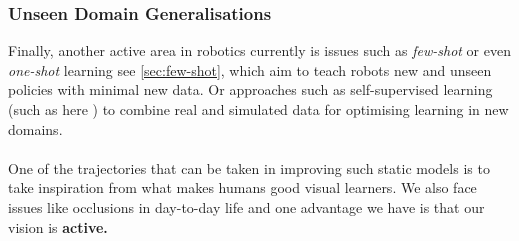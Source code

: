     \subsubsection{Unseen Domain Generalisations}
    Finally, another active area in robotics currently is issues such as \emph{few-shot} or even \emph{one-shot} learning see \ref{sec:few-shot}, which aim to teach robots new and unseen policies with minimal new data. Or approaches such as self-supervised learning (such as here \cite{lim2022real2sim2real, huang2021robot}) to combine real and simulated data for optimising learning in new domains.
    \\\\
    One of the trajectories that can be taken in improving such static models is to take inspiration from what makes humans good visual learners. We also face issues like occlusions in day-to-day life and one advantage we have is that our vision is \textbf{active.}
    
  

    